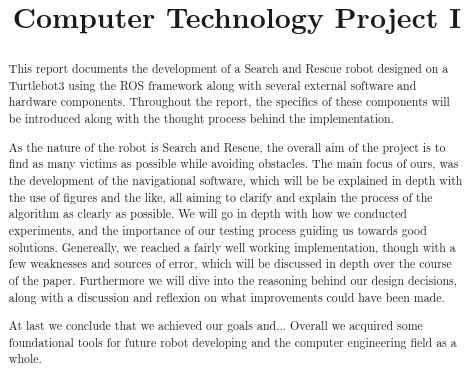 \documentclass[conference]{IEEEtran}
\begin{document}
\title{Computer Technology Project I\\}

\author{
\and
{}
}

\maketitle

\begin{abstract}
    This report documents the development of a Search and Rescue robot designed on a Turtlebot3 using the ROS framework along with several external software and hardware components.
    Throughout the report, the specifics of these components will be introduced along with the thought process behind the implementation.

    As the nature of the robot is Search and Rescue, the overall aim of the project is to find as many victims as possible while avoiding obstacles.
    The main focus of ours, was the development of the navigational software, which will be be explained in depth with the use of figures and the like, all aiming to clarify and explain the process of the algorithm as clearly as possible.
    We will go in depth with how we conducted experiments, and the importance of our testing process guiding us towards good solutions.
    Genereally, we reached a fairly well working implementation, though with a few weaknesses and sources of error, which will be discussed in depth over the course of the paper.
    Furthermore we will dive into the reasoning behind our design decisions, along with a discussion and reflexion on what improvements could have been made.

    At last we conclude that we achieved our goals and...
    Overall we acquired some foundational tools for future robot developing and the computer engineering field as a whole.
\end{abstract}
\end{document}
